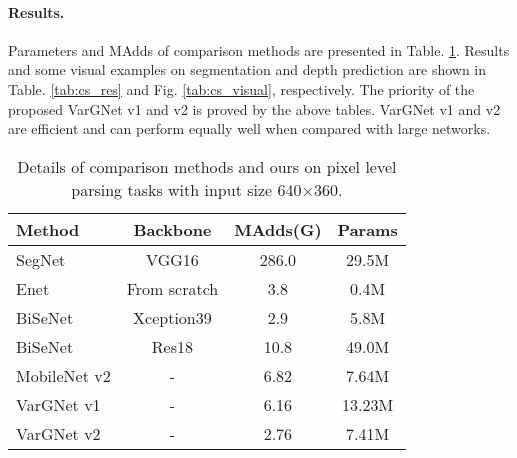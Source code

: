 \documentclass{article}
\begin{document}
\paragraph{Results.} Parameters and MAdds of comparison methods are presented in Table. \ref{tab:cs_com}.
Results and some visual examples on segmentation and depth prediction are shown in Table. \ref{tab:cs_res} and Fig. \ref{tab:cs_visual}, respectively. The priority of the proposed VarGNet v1 and v2 is proved by the above tables. VarGNet v1 and v2 are efficient and can perform equally well when compared with large networks.

\begin{table}
  \centering
  \caption{Details of comparison methods and ours on pixel level parsing tasks with input size 640$\times$360.}\label{tab:cs_com}
  \begin{tabular}{lccc}
  \toprule
  Method & Backbone & MAdds(G) & Params \\ \midrule
  SegNet\cite{badrinarayanan2017segnet} & VGG16 & 286.0 & 29.5M \\
  Enet\cite{paszke2016enet} & From scratch & 3.8 & 0.4M \\
  BiSeNet\cite{yu2018bisenet} & Xception39 & 2.9 & 5.8M \\
  BiSeNet\cite{yu2018bisenet} & Res18 & 10.8 & 49.0M \\ \midrule
  MobileNet v2 & - & 6.82 &	7.64M \\ \midrule
  VarGNet v1 & - & 6.16 & 13.23M \\
  VarGNet v2  & - & 2.76 & 7.41M \\
\bottomrule
  \end{tabular}
\end{table}
\end{document}
